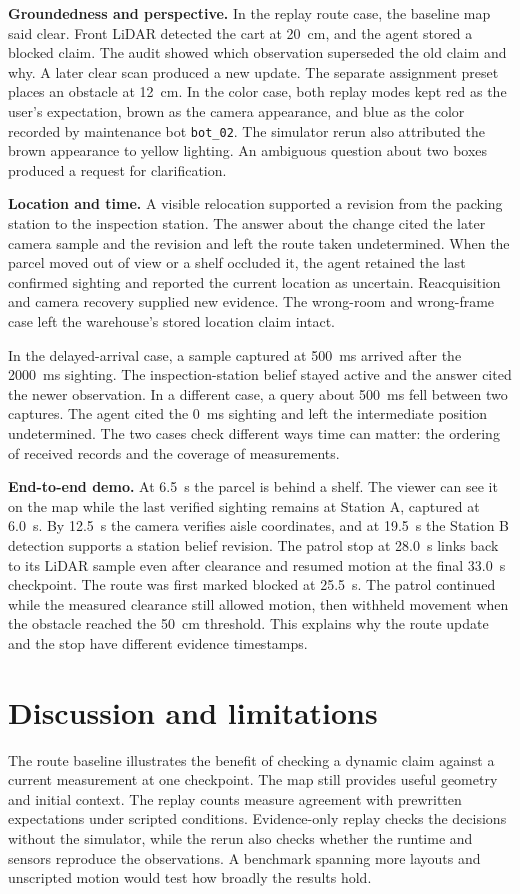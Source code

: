 \documentclass[11pt,a4paper,twocolumn]{article}
\begin{document}
\textbf{Groundedness and perspective.} In the replay route case,
the baseline map said clear. Front LiDAR detected the cart at
20~cm, and the agent stored a blocked claim. The audit showed
which observation superseded the old claim and why. A later clear
scan produced a new update. The separate assignment preset places
an obstacle at 12~cm. In the color case, both replay modes kept
red as the user's expectation, brown as the camera appearance, and
blue as the color recorded by maintenance bot \texttt{bot\_02}.
The simulator rerun also attributed the brown appearance to yellow
lighting. An ambiguous question about two boxes produced a request
for clarification.

\textbf{Location and time.} A visible relocation supported a
revision from the packing station to the inspection station.
The answer about the change cited the later camera sample and the
revision and left the route taken undetermined. When the parcel
moved out of view or a shelf occluded it, the agent retained the
last confirmed sighting and reported the current location as
uncertain. Reacquisition and camera recovery supplied new evidence.
The wrong-room and wrong-frame case left the warehouse's
stored location claim intact.

In the delayed-arrival case, a sample captured at 500~ms arrived
after the 2000~ms sighting. The inspection-station belief stayed
active and the answer cited the newer observation. In a different
case, a query about 500~ms fell between two captures. The agent
cited the 0~ms sighting and left the intermediate position
undetermined. The two cases check different ways time can matter:
the ordering of received records and the coverage of measurements.

\textbf{End-to-end demo.} At 6.5~s the parcel is behind a shelf.
The viewer can see it on the map while the last verified sighting
remains at Station A, captured at 6.0~s. By 12.5~s the camera
verifies aisle coordinates, and at 19.5~s the Station B detection
supports a station belief revision. The patrol stop at 28.0~s
links back to its LiDAR sample even after clearance and resumed
motion at the final 33.0~s checkpoint.
The route was first marked blocked at 25.5~s. The patrol continued
while the measured clearance still allowed motion, then withheld
movement when the obstacle reached the 50~cm threshold. This explains
why the route update and the stop have different evidence timestamps.

\section{Discussion and limitations}
The route baseline illustrates the benefit of checking a dynamic
claim against a current measurement at one checkpoint. The map
still provides useful geometry and initial context. The replay
counts measure agreement with prewritten expectations under scripted
conditions. Evidence-only replay checks the decisions without the
simulator, while the rerun also checks whether the runtime and
sensors reproduce the observations. A benchmark spanning more
layouts and unscripted motion would test how broadly the results hold.
\end{document}
